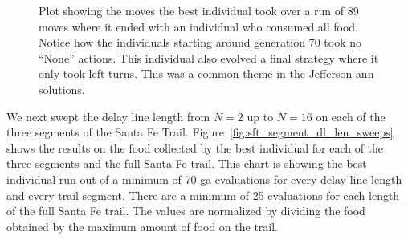 \begin{figure}[hbt]
\centering
{}
\caption[Moves Type in Santa Fe Trail]{Plot showing the moves the best individual took over a run of 89 moves where it ended with an individual who consumed all food. Notice how the individuals starting around generation 70 took no ``None'' actions. This individual also evolved a final strategy where it only took left turns. This was a common theme in the Jefferson \gls{ann} solutions.}
\label{fig:sft_none_evidence_plot}
\end{figure}

\clearpage
We next swept the delay line length from $N=2$ up to $N=16$ on each of the three segments of the Santa Fe Trail. Figure~\ref{fig:sft_segment_dl_len_sweeps} shows the results on the food collected by the best individual for each of the three segments and the full Santa Fe trail. This chart is showing the best individual run out of a minimum of 70 \gls{ga} evaluations for every delay line length and every trail segment. There are a minimum of 25 evaluations for each length of the full Santa Fe trail. The values are normalized by dividing the food obtained by the maximum amount of food on the trail.


